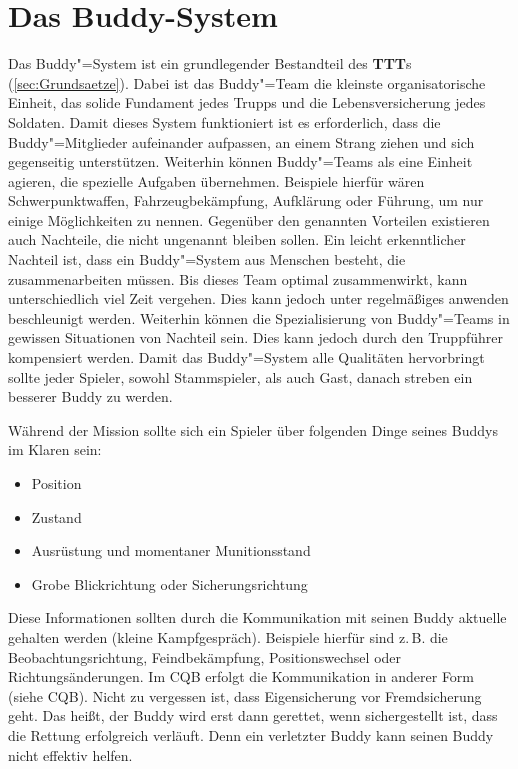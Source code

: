 \section{Das Buddy-System}
	Das Buddy"=System ist ein grundlegender Bestandteil des \textbf{TTT}s (\ref{sec:Grundsaetze}). Dabei ist das Buddy"=Team die kleinste organisatorische Einheit, das solide Fundament jedes Trupps und die Lebensversicherung jedes Soldaten. Damit dieses System funktioniert ist es erforderlich, dass die Buddy"=Mitglieder aufeinander aufpassen, an einem Strang ziehen und sich gegenseitig unterstützen. Weiterhin können Buddy"=Teams als eine Einheit agieren, die spezielle Aufgaben übernehmen. Beispiele hierfür wären Schwerpunktwaffen, Fahrzeugbekämpfung, Aufklärung oder Führung, um nur einige Möglichkeiten zu nennen. Gegenüber den genannten Vorteilen existieren auch Nachteile, die nicht ungenannt bleiben sollen. Ein leicht erkenntlicher Nachteil ist, dass ein Buddy"=System aus Menschen besteht, die zusammenarbeiten müssen. Bis dieses Team optimal zusammenwirkt, kann unterschiedlich viel Zeit vergehen. Dies kann jedoch unter regelmäßiges anwenden beschleunigt werden. Weiterhin können die Spezialisierung von Buddy"=Teams in gewissen Situationen von Nachteil sein. Dies kann jedoch durch den Truppführer kompensiert werden. Damit das Buddy"=System alle Qualitäten hervorbringt sollte jeder Spieler, sowohl Stammspieler, als auch Gast, danach streben ein besserer Buddy zu werden.
	\par\medskip
	Während der Mission sollte sich ein Spieler über folgenden Dinge seines Buddys im Klaren sein:
	\begin{itemize}
		\item Position
		\item Zustand 
		\item Ausrüstung und momentaner Munitionsstand
		\item Grobe Blickrichtung oder Sicherungsrichtung
	\end{itemize}
	Diese Informationen sollten durch die Kommunikation mit seinen Buddy aktuelle gehalten werden (kleine Kampfgespräch). Beispiele hierfür sind z.\,B. die Beobachtungsrichtung, Feindbekämpfung, Positionswechsel oder Richtungsänderungen. Im  \ac{CQB} erfolgt die Kommunikation in anderer Form (siehe CQB). %
	Nicht zu vergessen ist, dass Eigensicherung vor Fremdsicherung geht. Das heißt, der Buddy wird erst dann gerettet, wenn sichergestellt ist, dass die Rettung erfolgreich verläuft. Denn ein verletzter Buddy kann seinen Buddy nicht effektiv helfen.